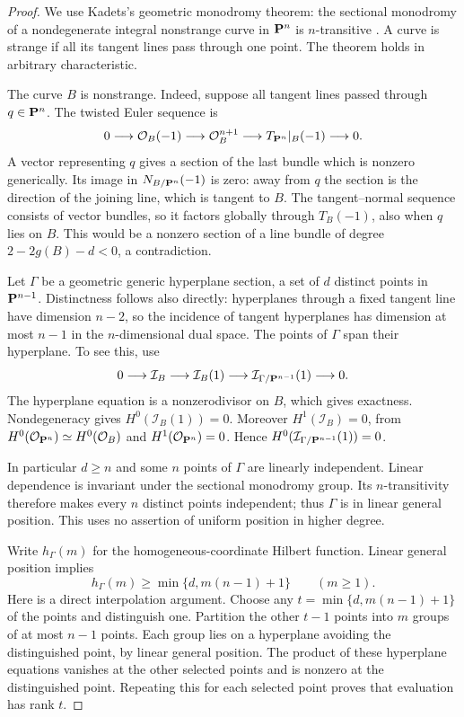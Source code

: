 \begin{proof}
We use Kadets's geometric monodromy theorem: the sectional
monodromy of a nondegenerate integral nonstrange curve in
$\mathbf P^n$ is $n$-transitive
\cite[Proposition~2.8 and proof, pp.~4--5]{Kadets}.
A curve is strange if all its tangent lines pass through one
point. The theorem holds in arbitrary characteristic.

The curve $B$ is nonstrange. Indeed, suppose all tangent lines
passed through $q\in\mathbf P^n$. The twisted Euler sequence is
\[
 0\longrightarrow\mathcal O_B(-1)\longrightarrow\mathcal O_B^{n+1}
 \longrightarrow T_{\mathbf P^n}|_B(-1)\longrightarrow0.
\]
A vector representing $q$ gives a section of the last bundle
which is nonzero generically. Its image in
$N_{B/\mathbf P^n}(-1)$ is zero: away from $q$ the section is the
direction of the joining line, which is tangent to $B$.
The tangent--normal sequence consists of vector bundles, so it
factors globally through $T_B(-1)$, also when $q$ lies on $B$.
This would be a nonzero section of a line bundle of degree
$2-2g(B)-d<0$, a contradiction.

Let $\Gamma$ be a geometric generic hyperplane section, a set
of $d$ distinct points in $\mathbf P^{n-1}$. Distinctness follows
also directly: hyperplanes through a fixed tangent line have
dimension $n-2$, so the incidence of tangent hyperplanes has
dimension at most $n-1$ in the $n$-dimensional dual space.
The points of $\Gamma$ span their hyperplane. To see this, use
\[
 0\longrightarrow\mathcal I_B\longrightarrow\mathcal I_B(1)
 \longrightarrow\mathcal I_{\Gamma/\mathbf P^{n-1}}(1)
 \longrightarrow0.
\]
The hyperplane equation is a nonzerodivisor on $B$, which gives
exactness. Nondegeneracy gives $H^0(\mathcal I_B(1))=0$.
Moreover $H^1(\mathcal I_B)=0$, from
$H^0(\mathcal O_{\mathbf P^n})\simeq H^0(\mathcal O_B)$ and
$H^1(\mathcal O_{\mathbf P^n})=0$. Hence
$H^0(\mathcal I_{\Gamma/\mathbf P^{n-1}}(1))=0$.

In particular $d\geq n$ and some $n$ points of $\Gamma$ are
linearly independent. Linear dependence is invariant under the
sectional monodromy group. Its $n$-transitivity therefore makes
every $n$ distinct points independent; thus $\Gamma$ is in
linear general position. This uses no assertion of uniform
position in higher degree.

Write $h_\Gamma(m)$ for the homogeneous-coordinate Hilbert
function. Linear general position implies
\[
 h_\Gamma(m)\geq\min\{d,m(n-1)+1\}\qquad(m\geq1).
\]
Here is a direct interpolation argument. Choose any
$t=\min\{d,m(n-1)+1\}$ of the points and distinguish one.
Partition the other $t-1$ points into $m$ groups of at most
$n-1$ points. Each group lies on a hyperplane avoiding the
distinguished point, by linear general position. The product
of these hyperplane equations vanishes at the other selected
points and is nonzero at the distinguished point. Repeating
this for each selected point proves that evaluation has rank
$t$.


\end{proof}
